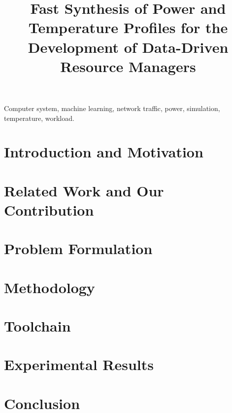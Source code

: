 \documentclass[conference]{IEEEtran}
\title{
  \fontsize{22}{26}\selectfont
  Fast Synthesis of Power and Temperature Profiles for the
  Development of Data-Driven Resource Managers
  \vspace{-2em}
}
\author{}
\begin{document}
  \maketitle

  \begin{abstract}
    
  \end{abstract}

  \begin{IEEEkeywords}
    Computer system,
    machine learning,
    network traffic,
    power,
    simulation,
    temperature,
    workload.
  \end{IEEEkeywords}


  \section{Introduction and Motivation} 
  

  \section{Related Work and Our Contribution}

  
  \section{Problem Formulation} 
  

  \section{Methodology} 
  

  \section{Toolchain} 
  

  \section{Experimental Results} 
  

  \section{Conclusion} 
  

  
  
\end{document}
